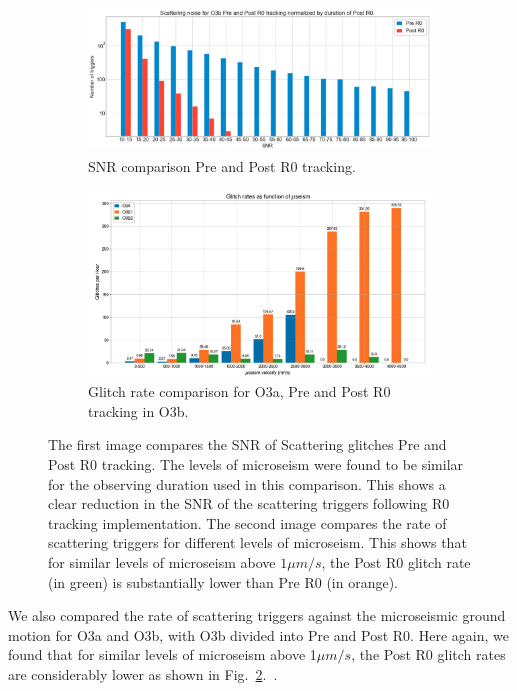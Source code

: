 \documentclass[12pt]{iopart}
\begin{document}
\begin{figure}[h]
   \centering
    \begin{subfigure}[b]{0.45\textwidth}
        \centering
         \includegraphics[width= \textwidth,height=3.9cm]{snr_preandpost.eps}
         \caption{SNR comparison Pre and Post R0 tracking.}
         \label{fig:snr_r0}
    \end{subfigure}
    \hfill
    \begin{subfigure}[b]{0.45\textwidth}
        \centering
         \includegraphics[width =\textwidth]{rate_r0.png}
         \caption{Glitch rate comparison for O3a, Pre and Post R0 tracking in O3b.}
         \label{fig:rate_r0}
         
    
    \end{subfigure}
    \caption{The first image compares the SNR of Scattering glitches Pre and Post R0 tracking. The levels of microseism were found to be similar for the observing duration used in this comparison. This shows a clear reduction in the SNR of the scattering triggers following R0 tracking implementation. The second image compares the rate of scattering triggers for different levels of microseism. This shows that for similar levels of microseism above $1{\mu}m/s$, the Post R0 glitch rate (in green) is substantially lower than Pre R0 (in orange).}
    \label{fig:postr0_scat}
    
\end{figure}
We also compared the rate of scattering triggers against the microseismic ground motion for O3a and O3b, with O3b divided into Pre and Post R0. Here again, we found that for similar levels of microseism above 1${\mu}m/s$, the Post R0 glitch rates are considerably lower as shown in Fig.~\ref{fig:rate_r0}.~\cite{alog_corey}.
\end{document}
